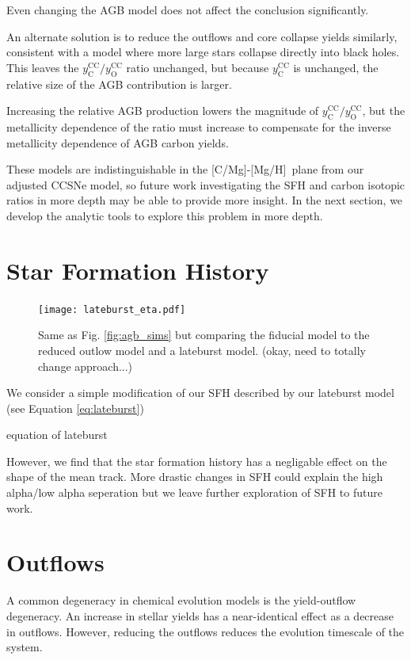 \documentclass[12pt,oneside]{report}
\newcommand{\caah}{[C/Mg]-[Mg/H]}
\begin{document}
Even changing the AGB model does not affect the conclusion significantly. 

An alternate solution is to reduce the outflows and core collapse yields similarly, consistent with a model where more large stars collapse directly into black holes. This leaves the $y_\text{C}^\text{CC}/y_\text{O}^\text{CC}$ ratio unchanged, but because $y_\text{C}^\text{CC}$ is unchanged, the relative size of the AGB contribution is larger. 


Increasing the relative AGB production lowers the magnitude of  $y_\text{C}^\text{CC}/y_\text{O}^\text{CC}$, but the metallicity dependence of the ratio must increase to compensate for the inverse metallicity dependence of AGB carbon yields. 

These models are indistinguishable in the \caah~plane from our adjusted CCSNe model, so future work investigating the SFH and carbon isotopic ratios in more depth may be able to provide more insight. In the next section, we develop the analytic tools to explore this problem in more depth. 



\section{Star Formation History}

\begin{figure}
\centering
\texttt{[image: lateburst\_eta.pdf]}

\caption[Lateburst and reduced-outflow models]{Same as Fig. \ref{fig:agb_sims} but comparing the fiducial model to the reduced outlow model and a lateburst model. (okay, need to totally change approach...)}
\end{figure}

We consider a simple modification of our SFH described by our lateburst model
(see Equation \ref{eq:lateburst})

equation of lateburst

However, we find that the star formation history has a negligable effect on the shape of the mean track. More drastic changes in SFH could explain the high alpha/low alpha seperation but we leave further exploration of SFH to future work. 








\section{Outflows}
A common degeneracy in chemical evolution models is the yield-outflow degeneracy. An increase in stellar yields has a near-identical effect as a decrease in outflows. However, reducing the outflows reduces the evolution timescale of the system. 
\end{document}
